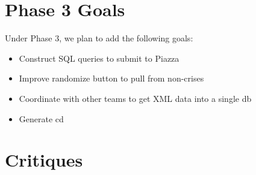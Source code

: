 \documentclass[12pt]{report}
\begin{document}
\newpage
\section*{Phase 3 Goals}
\hfill

Under Phase 3, we plan to add the following goals:
\begin{itemize}
\item Construct SQL queries to submit to Piazza
\item Improve randomize button to pull from non-crises
\item Coordinate with other teams to get XML data into a single db
\item Generate cd
\end{itemize}

\newpage
\section*{Critiques}
\hfill
\end{document}
